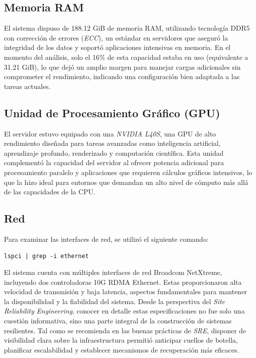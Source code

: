 \subsection*{Memoria RAM}
El sistema dispuso de 188.12 GiB de memoria RAM, utilizando tecnología DDR5 con corrección de errores (\textit{ECC}), un estándar en servidores que aseguró la integridad de los datos y soportó aplicaciones intensivas en memoria. En el momento del análisis, solo el 16\% de esta capacidad estaba en uso (equivalente a 31.21 GiB), lo que dejó un amplio margen para manejar cargas adicionales sin comprometer el rendimiento, indicando una configuración bien adaptada a las tareas actuales.

\subsection*{Unidad de Procesamiento Gráfico (GPU)}
El servidor estuvo equipado con una \textit{NVIDIA L40S}, una GPU de alto rendimiento diseñada para tareas avanzadas como inteligencia artificial, aprendizaje profundo, renderizado y computación científica. Esta unidad complementó la capacidad del servidor al ofrecer potencia adicional para procesamiento paralelo y aplicaciones que requieren cálculos gráficos intensivos, lo que la hizo ideal para entornos que demandan un alto nivel de cómputo más allá de las capacidades de la CPU.

\subsection*{Red}
Para examinar las interfaces de red, se utilizó el siguiente comando:
\begin{verbatim}
lspci | grep -i ethernet
\end{verbatim}

El sistema cuenta con múltiples interfaces de red Broadcom NetXtreme, incluyendo dos controladoras 10G RDMA Ethernet. Estas proporcionaron alta velocidad de transmisión y baja latencia, aspectos fundamentales para mantener la disponibilidad y la fiabilidad del sistema.
Desde la perspectiva del \textit{Site Reliability Engineering}, conocer en detalle estas especificaciones no fue solo una cuestión informativa, sino una parte integral de la construcción de sistemas resilientes. Tal como se recomienda en las buenas prácticas de \textit{SRE}, disponer de visibilidad clara sobre la infraestructura permitió anticipar cuellos de botella, planificar escalabilidad y establecer mecanismos de recuperación más eficaces.

